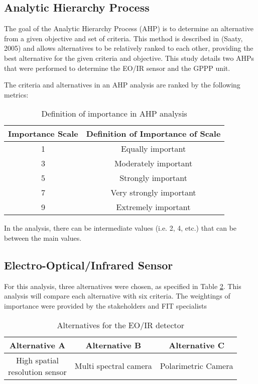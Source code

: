 \begin{fullwidth}
    \section{Analytic Hierarchy Process}
    The goal of the Analytic Hierarchy Process (AHP) is to determine an alternative from a given objective and set of criteria. This method is described in (Saaty, 2005) and allows alternatives to be relatively ranked to each other, providing the best alternative for the given criteria and objective. This study details two AHPs that were performed to determine the EO/IR sensor and the GPPP unit.

    The criteria and alternatives in an AHP analysis are ranked by the following metrics: \\
    \begin{table}[h!]
        \centering
        \begin{tabular}{|c|c|}
        \hline
            \textbf{Importance Scale} & \textbf{Definition of Importance of Scale} \\
            \hline
            1 & Equally important \\ \hline
            3 & Moderately important \\ \hline
            5 & Strongly important \\ \hline
            7 & Very strongly important \\ \hline
            9 & Extremely important \\
            \hline
        \end{tabular}
        \caption{Definition of importance in AHP analysis}
        \label{tab:ahp_importance_scale}
    \end{table}
    In the analysis, there can be intermediate values (i.e. 2, 4, etc.) that can be between the main values.

    \subsection{Electro-Optical/Infrared Sensor}
        For this analysis, three alternatives were chosen, as specified in Table \ref{tab:eoir_alternatives}. This analysis will compare each alternative with six criteria. The weightings of importance were provided by the stakeholders and FIT specialists

        \begin{table}[]
            \centering
            \begin{tabular}{|c|c|c|}
                \hline
                 \textbf{Alternative A} & \textbf{Alternative B} & \textbf{Alternative C} \\
                 \hline
                 \shortstack{High spatial \\ resolution sensor} & Multi spectral camera & Polarimetric Camera \\ \hline
            \end{tabular}
            \caption{Alternatives for the EO/IR detector}
            \label{tab:eoir_alternatives}
        \end{table}


\end{fullwidth}
